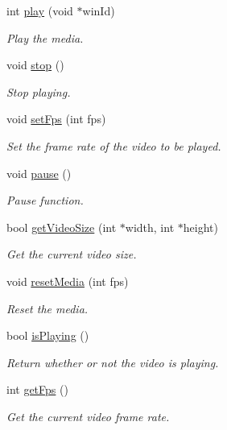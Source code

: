 \begin{DoxyCompactItemize}
int \hyperlink{classVLCWrapper_a954f054bc8ff9259427d368a6e4700d1}{play} (void $\ast$win\-Id)
\begin{DoxyCompactList}\small\item\em Play the media. \end{DoxyCompactList}\item 
void \hyperlink{classVLCWrapper_a2ddae6b4fb05cd9cd149c6769d8fa7a9}{stop} ()
\begin{DoxyCompactList}\small\item\em Stop playing. \end{DoxyCompactList}\item 
void \hyperlink{classVLCWrapper_abb027f9dfb30636141f85a1292885634}{set\-Fps} (int fps)
\begin{DoxyCompactList}\small\item\em Set the frame rate of the video to be played. \end{DoxyCompactList}\item 
void \hyperlink{classVLCWrapper_a8dadd74aef3a683cf73b677bc98db70c}{pause} ()
\begin{DoxyCompactList}\small\item\em Pause function. \end{DoxyCompactList}\item 
bool \hyperlink{classVLCWrapper_a806ad002020aaba2f471ee948226cb0c}{get\-Video\-Size} (int $\ast$width, int $\ast$height)
\begin{DoxyCompactList}\small\item\em Get the current video size. \end{DoxyCompactList}\item 
void \hyperlink{classVLCWrapper_a7d2f4f7b0f796711b614f2d9f6ea63ee}{reset\-Media} (int fps)
\begin{DoxyCompactList}\small\item\em Reset the media. \end{DoxyCompactList}\item 
bool \hyperlink{classVLCWrapper_a52d4cde1548105d10d1b8906fac68dac}{is\-Playing} ()
\begin{DoxyCompactList}\small\item\em Return whether or not the video is playing. \end{DoxyCompactList}\item 
int \hyperlink{classVLCWrapper_a696fd0d152c68c757f9135669cbcbe56}{get\-Fps} ()
\begin{DoxyCompactList}\small\item\em Get the current video frame rate. \end{DoxyCompactList}\item 

\end{DoxyCompactItemize}
